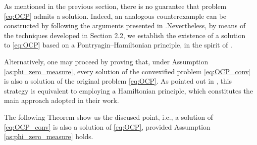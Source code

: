 As mentioned in the previous section, there is no guarantee that problem \eqref{eq:OCP} admits a 
solution. Indeed, an analogous counterexample can be constructed by following the arguments presented 
in \cite[Section 4.5]{wachsmuth2019}.Nevertheless, by means of the techniques developed in Section 2.2, 
we establish the existence of a solution to \eqref{eq:OCP} based on a Pontryagin–Hamiltonian principle,
 in the spirit of \cite{ito-kunisch2014}.

Alternatively, one may proceed by proving that, under Assumption \ref{as:phi_zero_measure}, 
every solution of the convexified problem \eqref{eq:OCP_conv} is also a solution of the original 
problem \eqref{eq:OCP}. As pointed out in \cite{ito-kunisch2014}, this strategy is equivalent to 
employing a Hamiltonian principle, which constitutes the main approach adopted in their work.


The following Theorem show us the discused point, i.e., a solution of \eqref{eq:OCP_conv} is also a 
solution of \eqref{eq:OCP}, provided Assumption \ref{as:phi_zero_measure} holds.


